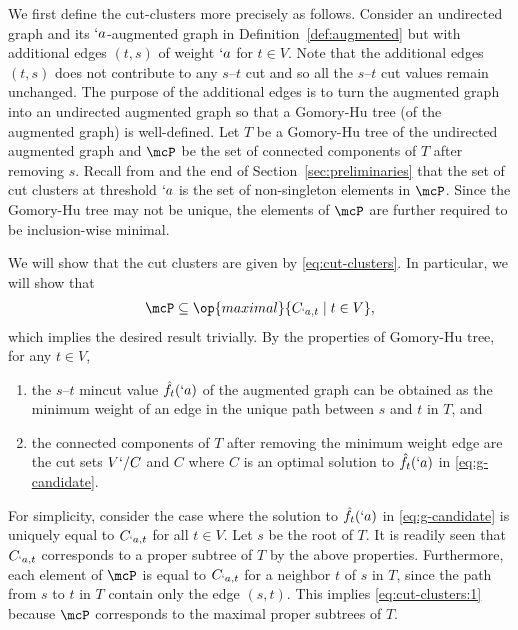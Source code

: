 \begin{Proof}
  We first define the cut-clusters more precisely as follows.
  Consider an undirected graph and its $`a$-augmented graph in Definition~\ref{def:augmented} but with additional edges $(t,s)$ of weight $`a$ for $t\in V$. Note that the additional edges $(t,s)$ does not contribute to any $s$--$t$ cut and so all the $s$--$t$ cut values remain unchanged. The purpose of the additional edges is to turn the augmented graph into an undirected augmented graph so that a Gomory-Hu tree (of the augmented graph) is well-defined. 
  Let $T$ be a Gomory-Hu tree of the undirected augmented graph and $\mcP$ be the set of connected components of $T$ after removing $s$. 
  Recall from \cite{flake:cut-clustering} and the end of Section~\ref{sec:preliminaries} that the set of cut clusters at threshold $`a$ is the set of non-singleton elements in $\mcP$. Since the Gomory-Hu tree may not be unique, the elements of $\mcP$ are further required to be inclusion-wise minimal. 
  
  We will show that the cut clusters are given by \eqref{eq:cut-clusters}. In particular, we will show that
  \begin{align}
      \mcP\subseteq \op{maximal}\Set{C_{`a,t}\mid t\in V}, \label{eq:cut-clusters:1}
  \end{align}
  which implies the desired result trivially. By the properties of Gomory-Hu tree, for any $t\in V$,
  \begin{enumerate}
      \item\label{prop:cc:1} the $s$--$t$ mincut value $\hat{f}_t(`a)$ of the augmented graph can be obtained as the minimum weight of an edge in the unique path between $s$ and $t$ in $T$, and
      \item\label{prop:cc:2} the connected components of $T$ after removing the minimum weight edge are the cut sets $V`/C$ and $C$ where $C$ is an optimal solution to $\hat{f}_t(`a)$ in \eqref{eq:g-candidate}.
  \end{enumerate}
  For simplicity, consider the case where the solution to $\hat{f}_t(`a)$ in \eqref{eq:g-candidate} is uniquely equal to $C_{`a,t}$ for all $t\in V$. 
  Let $s$ be the root of $T$. It is readily seen that $C_{`a,t}$ corresponds to a proper subtree of $T$ by the above properties. Furthermore, each element of $\mcP$ is equal to $C_{`a,t}$ for a neighbor $t$ of $s$ in $T$, since the path from $s$ to $t$ in $T$ contain only the edge $(s,t)$. This implies \eqref{eq:cut-clusters:1} because $\mcP$ corresponds to the maximal proper subtrees of $T$.
  

\end{Proof}
